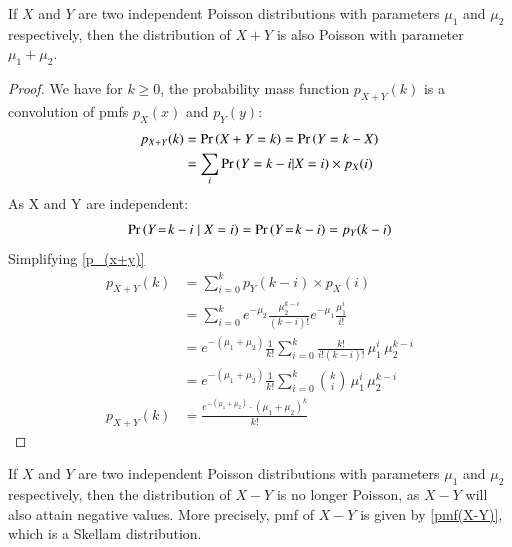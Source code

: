 \documentclass[journal,12pt,twocolumn]{IEEEtran}
\begin{document}
    \begin{lemma}\label{lemma_X+Y}
        If $X$ and $Y$ are two independent Poisson distributions with parameters $\mu_1$ and $\mu_2$ respectively, then the distribution of $X+Y$ is also Poisson with parameter $\mu_1 + \mu_2$. 
    \end{lemma}
    \begin{proof}
         We have for $k \geq 0$, the probability mass function $p_{X+Y}(k)$ is a convolution of pmfs $p_X(x)$ and $p_Y(y)$: 
    \begin{align}
       p_{X+Y}(k) &= \pr{X+ Y = k} = \pr{Y = k - X}\\
       &= \sum_{i}\pr{Y = k - i| X=i}\times p_X(i)\label{p_(x+y)}
    \end{align}
    As X and Y are independent: 
    \begin{align}
        \Pr\left(Y\! =\! k - i \mid X=i\right) = \Pr\left(Y\! = \! k - i\right) = p_Y(k-i)
    \end{align}
    Simplifying \eqref{p_(x+y)}
    \begin{align}
        p_{X+Y}(k) &= \sum_{i=0}^k p_Y(k-i) \times p_X(i)\\
        &= \sum_{i=0}^k e^{-\mu_2}\frac{\mu_2^{k-i}}{(k-i)!}e^{-\mu_1}\frac{\mu_1^i}{i!}\\
        &= e^{-(\mu_1 + \mu_2)}\frac 1{k!}\sum_{i=0}^k \frac{k!}{i!(k-i)!}\,\mu_1^i\,\mu_2^{k-i}\\
        &= e^{-(\mu_1 + \mu_2)}\frac 1{k!}\sum_{i=0}^k {k\choose i}\, \mu_1^i\,\mu_2^{k-i}\\
        p_{X+Y}(k) &= \frac{e^{-(\mu_1 + \mu_2)} \cdot (\mu_1 + \mu_2)^k}{k!}
    \end{align}
    \end{proof}
    \begin{lemma}\label{lemma_X-Y}
        If $X$ and $Y$ are two independent Poisson distributions with parameters $\mu_1$ and $\mu_2$ respectively, then the distribution of $X-Y$ is no longer Poisson, as $X - Y$ will also attain negative values.  More precisely, pmf of $X-Y$ is given by \eqref{pmf(X-Y)}, which is a Skellam distribution.
    \end{lemma}
\end{document}
